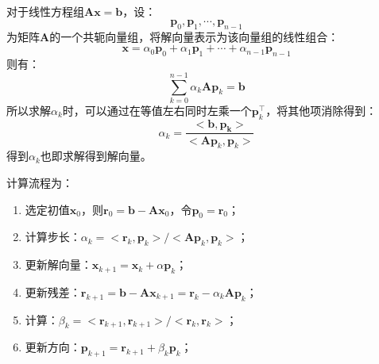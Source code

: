\documentclass[12pt, onecolumn]{article}
\newcommand\normf{\fangsong}
\begin{document}
	\subsection{\normf{算法描述}}
	对于线性方程组$\boldsymbol{A}\boldsymbol{x}=\boldsymbol{b}$，设：
	\begin{equation}
	\boldsymbol{p}_0,\boldsymbol{p}_1,\cdots,\boldsymbol{p}_{n-1}
	\end{equation}
	为矩阵$\boldsymbol{A}$的一个共轭向量组，将解向量表示为该向量组的线性组合：
	\begin{equation}
	\boldsymbol{x}=\alpha_0\boldsymbol{p}_0+\alpha_1\boldsymbol{p}_1+\cdots+\alpha_{n-1}\boldsymbol{p}_{n-1}
	\end{equation}
	则有：
	\begin{equation}
	\sum_{k=0}^{n-1}\alpha_k\boldsymbol{A}\boldsymbol{p}_k
	=\boldsymbol{b}
	\end{equation}
	所以求解$\alpha_k$时，可以通过在等值左右同时左乘一个$\boldsymbol{p}_k^\top$，将其他项消除得到：
	\begin{equation}
	\alpha_k=\frac{<\boldsymbol{b,\boldsymbol{p}_k}>}{<\boldsymbol{A}\boldsymbol{p}_k,\boldsymbol{p}_k>}
	\end{equation}
	得到$\alpha_k$也即求解得到解向量。
	
	计算流程为：
	\begin{enumerate}
	\item 选定初值$\boldsymbol{x}_0$，则$\boldsymbol{r}_0=\boldsymbol{b}-\boldsymbol{Ax}_0$，令$\boldsymbol{p}_0=\boldsymbol{r}_0$；
	
	\item 计算步长：$\alpha_k=<\boldsymbol{r}_k,\boldsymbol{p}_k>/<\boldsymbol{Ap}_k,\boldsymbol{p}_k>$；
	
	\item 更新解向量：$\boldsymbol{x}_{k+1}=\boldsymbol{x}_k+\alpha \boldsymbol{p}_k$；
	
	\item 更新残差：$\boldsymbol{r}_{k+1}=\boldsymbol{b}-\boldsymbol{Ax}_{k+1}=\boldsymbol{r}_k-\alpha_k\boldsymbol{Ap}_k$；
	
	\item 计算：$\beta_k=<\boldsymbol{r}_{k+1},\boldsymbol{r}_{k+1}>/<\boldsymbol{r}_{k},\boldsymbol{r}_{k}>$；
	
	\item 更新方向：$\boldsymbol{p}_{k+1}=\boldsymbol{r}_{k+1}+\beta_k\boldsymbol{p}_k$；
	\end{enumerate}
	
	\subsection{\normf{实验结果}}
\end{document}

